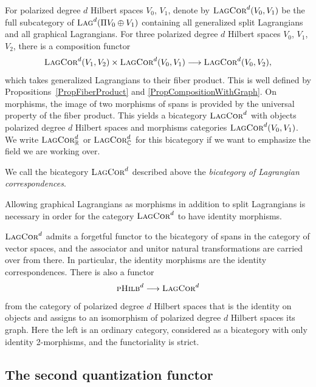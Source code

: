 \documentclass[10pt,a4paper]{amsart}
\numberwithin{equation}{section}
\newcommand{\Lag}{\textsc{Lag}}
\newcommand{\LagCor}{\textsc{LagCor}}
\newcommand{\pHilb}{\textsc{pHilb}}
\newcommand{\R}{\mathbb{R}}
\newcommand{\C}{\mathbb{C}}
\begin{document}
For polarized degree $d$ Hilbert spaces $V_0$, $V_1$, denote by $\LagCor^d(V_0, V_1)$ be the full subcategory of $\Lag^d(\Pi V_0 \oplus V_1)$ containing all generalized split Lagrangians and all graphical Lagrangians.
For three polarized degree $d$ Hilbert spaces $V_0$, $V_1$, $V_2$, there is a composition functor
\begin{equation*}
 \LagCor^d(V_1, V_2) \times \LagCor^d(V_0, V_1) \longrightarrow \LagCor^d(V_0, V_2),
\end{equation*}
which takes generalized Lagrangians to their fiber product.
This is well defined by Propositions~\ref{PropFiberProduct} and \ref{PropCompositionWithGraph}.
On morphisms, the image of two morphisms of spans is provided by the universal property of the fiber product.
This yields a bicategory $\LagCor^d$ with objects polarized degree $d$ Hilbert spaces and morphisms categories $\LagCor^d(V_0, V_1)$.
We write $\LagCor^d_\R$ or $\LagCor^d_\C$ for this bicategory if we want to emphasize the field we are working over.

\begin{Definition}
 We call the bicategory $\LagCor^d$ described above the \emph{bicategory of Lagrangian correspondences}.
\end{Definition}

\begin{Remark}
Allowing graphical Lagrangians as morphisms in addition to split Lagrangians is necessary in order for the category $\LagCor^d$ to have identity morphisms.
\end{Remark}

$\LagCor^d$ admits a forgetful functor to the bicategory of spans in the category of vector spaces, and the associator and unitor natural transformations are carried over from there.
In particular, the identity morphisms are the identity correspondences.
There is also a functor
\begin{equation*}
 \pHilb^d \longrightarrow \LagCor^d
\end{equation*}
from the category of polarized degree $d$ Hilbert spaces that is the identity on objects and assigns to an isomorphism of polarized degree $d$ Hilbert spaces its graph.
Here the left is an ordinary category, considered as a bicategory with only identity 2-morphisms, and the functoriality is strict.



\subsection{The second quantization functor}
\label{SectionSecondQuantization}
\end{document}
